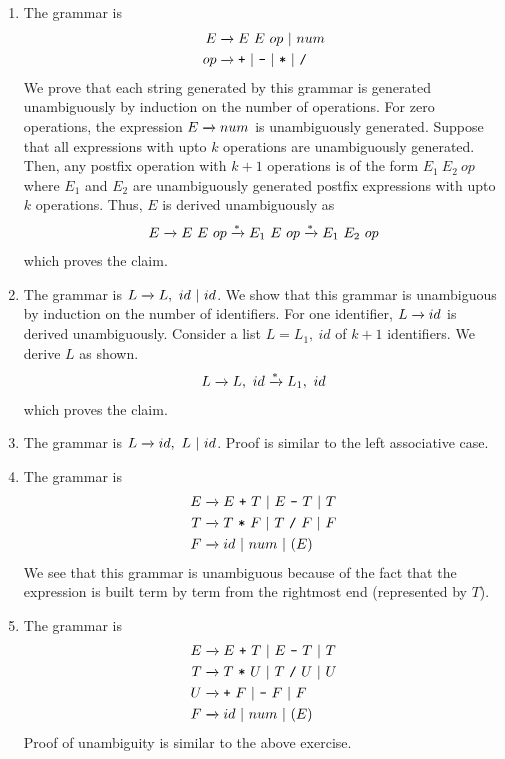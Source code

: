 \begin{solution}
    \begin{enumerate}[label=\alph*)]
        \item The grammar is 
        \begin{align*}
            E &\yld E\ E\ op\ |\ num \\
            op &\yld \texttt{+}\ |\ \texttt{-}\ |\ \texttt{*}\ |\ \texttt{/} 
        \end{align*}
        We prove that each string generated by this grammar is generated 
        unambiguously by induction on the number of operations. For zero 
        operations, the expression $E \xrightarrow{} num$ is unambiguously generated.
        Suppose that all expressions with upto $k$ operations are 
        unambiguously generated. Then, any postfix operation with $k + 1$
        operations is of the form $E_1\ E_2\ op$ where $E_1$ and $E_2$ are
        unambiguously generated postfix expressions with upto $k$ operations.
        Thus, $E$ is derived unambiguously as
        \begin{align*}
            E \xrightarrow{} E\ E\ op \xrightarrow{*} E_1\ E\ op \xrightarrow{*} E_1\ E_2\ op
        \end{align*}
        which proves the claim.
        \item The grammar is $L \yld L,\ id\ |\ id$. We show that this grammar 
        is unambiguous by induction on the number of identifiers. For one 
        identifier, $L \xrightarrow{} id$ is derived unambiguously. Consider a list 
        $L = L_1,\ id$ of $k + 1$ identifiers. We derive $L$ as shown.
        \begin{align*}
            L \xrightarrow{} L,\ id \xrightarrow{*} L_1,\ id
        \end{align*}
        which proves the claim.
        \item The grammar is $L \yld id,\ L\ |\ id$. Proof is similar to the 
        left associative case.
        \item The grammar is
        \begin{align*}
            E &\xrightarrow{} E\ \texttt{+}\ T\ |\ E\ \texttt{-}\ T\ |\ T \\
            T &\xrightarrow{} T\ \texttt{*}\ F\ |\ T\ \texttt{/}\ F\ |\ F \\
            F &\xrightarrow{} id\ |\ num\ |\ (E)
        \end{align*}
        We see that this grammar is unambiguous because of the fact that the 
        expression is built term by term from the rightmost end (represented 
        by $T$).
        \item The grammar is
        \begin{align*}
            E &\xrightarrow{} E\ \texttt{+}\ T\ |\ E\ \texttt{-}\ T\ |\ T \\
            T &\xrightarrow{} T\ \texttt{*}\ U\ |\ T\ \texttt{/}\ U\ |\ U \\
            U &\xrightarrow{} \texttt{+}\ F\ |\ \texttt{-}\ F\ |\ F \\
            F &\xrightarrow{} id\ |\ num\ |\ (E)
        \end{align*}
        Proof of unambiguity is similar to the above exercise.
    \end{enumerate}
\end{solution}